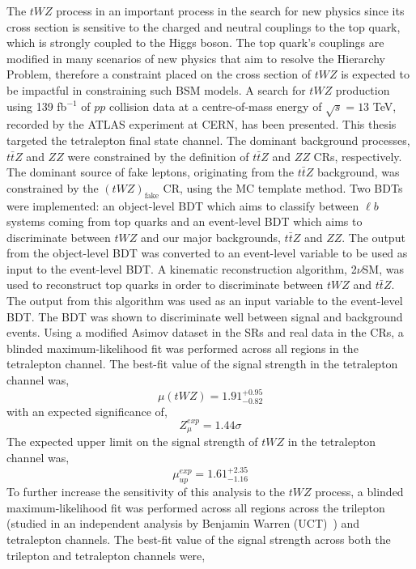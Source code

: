  

The $tWZ$ process in an important process in the search for new physics since its cross section is sensitive to the charged and neutral couplings to the top quark, which is strongly coupled to the Higgs boson. The top quark's couplings are modified in many scenarios of new physics that aim to resolve the Hierarchy Problem, therefore a constraint placed on the cross section of $tWZ$ is expected to be impactful in constraining such BSM models. A search for $tWZ$ production using 139 fb$^{-1}$ of $pp$ collision data at a centre-of-mass energy of $\sqrt{s} = 13$ TeV, recorded by the ATLAS experiment at CERN, has been presented. This thesis targeted the tetralepton final state channel. The dominant background processes, $t\bar{t}Z $ and $ZZ$ were constrained by the definition of $t\bar{t}Z$ and $ZZ$ CRs, respectively. The dominant source of fake leptons, originating from the $t\bar{t}Z$ background, was constrained by the $(tWZ)_{\text{fake}}$ CR, using the MC template method. Two BDTs were implemented: an object-level BDT which aims to classify between $\ell b$ systems coming from top quarks and an event-level BDT which aims to discriminate between $tWZ$ and our major backgrounds, $t\bar{t}Z$ and $ZZ$. The output from the object-level BDT was converted to an event-level variable to be used as input to the event-level BDT. A kinematic reconstruction algorithm, 2$\nu$SM, was used to reconstruct top quarks in order to discriminate between $tWZ$ and $t\bar{t}Z$. The output from this algorithm was used as an input variable to the event-level BDT. The BDT was shown to discriminate well between signal and background events. Using a modified Asimov dataset in the SRs and real data in the CRs, a blinded maximum-likelihood fit was performed across all regions in the tetralepton channel. The best-fit value of the signal strength in the tetralepton channel was,
\begin{equation}
  \mu (tWZ) =   1.91^{+0.95}_{-0.82}
\end{equation}
with an expected significance of,
\begin{equation}
 Z_{\mu}^{exp} = 1.44\sigma
\end{equation}
The expected upper limit on the signal strength of $tWZ$ in the tetralepton channel was,
\begin{equation}
  \mu_{up}^{exp} =   1.61^{+2.35}_{-1.16}
\end{equation}
To further increase the sensitivity of this analysis to the $tWZ$ process, a blinded maximum-likelihood fit was performed across all regions across the trilepton (studied in an independent analysis by Benjamin Warren (UCT)~\cite{ben-thesis}) and tetralepton channels. The best-fit value of the signal strength across both the trilepton and tetralepton channels were,


